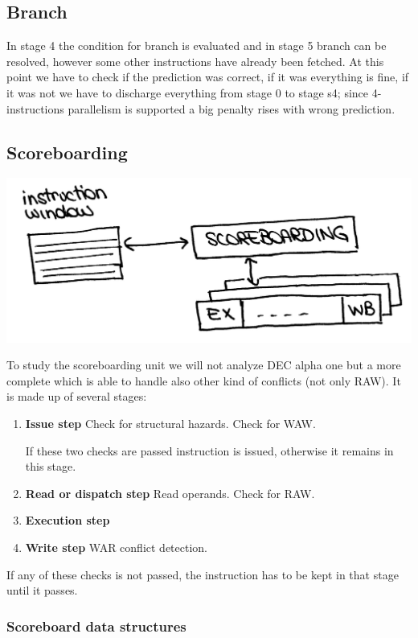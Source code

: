 \subsection{Branch}
In stage 4 the condition for branch is evaluated and in stage 5 branch can be
resolved, however some other instructions have already been fetched. At this
point we have to check if the prediction was correct, if it was
everything is fine, if it was not we have to discharge everything from stage 0
to stage s4; since 4-instructions parallelism is supported a big penalty
rises with wrong prediction.

\subsection {Scoreboarding}
\begin{center}
  \includegraphics[width=0.7\linewidth]{img/img3/11}
\end{center}

To study the scoreboarding unit we will not analyze DEC alpha one but a more
complete which is able to handle also other kind of conflicts (not only RAW).
It is made up of several stages:
\begin{enumerate}
\item \textbf{Issue step}
  \subitem Check for structural hazards.
  \subitem Check for WAW.

If these two checks are passed instruction is issued, otherwise it remains in
this stage.

\item \textbf{Read or dispatch step}
  \subitem Read operands.
  \subitem Check for RAW.

\item \textbf{Execution step}
\item \textbf{Write step}
  \subitem WAR conflict detection.
\end{enumerate}

If any of these checks is not passed, the instruction has to be kept in that
stage until it passes.

\subsubsection{Scoreboard data structures}

